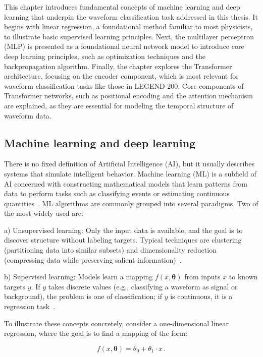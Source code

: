 
This chapter introduces fundamental concepts of machine learning and deep learning that underpin the waveform classification task addressed in this thesis. It begins with linear regression, a foundational method familiar to most physicists, to illustrate basic supervised learning principles.
Next, the multilayer perceptron (MLP) is presented as a foundational neural network model to introduce core deep learning principles, such as optimization techniques and the backpropagation algorithm. 
Finally, the chapter explores the Transformer architecture, focusing on the encoder component, which is most relevant for waveform classification tasks like those in LEGEND-200. Core components of Transformer networks, such as positional encoding and the attention mechanism are explained, as they are essential for modeling the temporal structure of waveform data. 

\subsection{Machine learning and deep learning}
There is no fixed definition of Artificial Intelligence (AI), but it usually describes systems that simulate intelligent behavior. Machine learning (ML) is a subfield of AI concerned with constructing mathematical models that learn patterns from data to perform tasks such as classifying events or estimating continuous quantities~\cite{badillo_introduction_2020, prince_understanding_2023}. 
ML algorithms are commonly grouped into several paradigms. Two of the most widely used are:

a) Unsupervised learning: Only the input data is available, and the goal is to discover structure without labeling targets. Typical techniques are clustering (partitioning data into similar subsets) and dimensionality reduction (compressing data while preserving salient information)~\cite{badillo_introduction_2020}. 

b) Supervised learning: Models learn a mapping $f(x, \boldsymbol{\theta})$ from inputs $x$ to known targets $y$. If $y$ takes discrete values (e.g., classifying a waveform as signal or background), the problem is one of classification; if $y$ is continuous, it is a regression task~\cite{prince_understanding_2023, badillo_introduction_2020}. 


To illustrate these concepts concretely, consider a one-dimensional linear regression, where the goal is to find a mapping of the form:

\begin{equation}
\label{eq:linear_regression}
	f(x, \boldsymbol{\theta}) =  \theta_0 + \theta_1 \cdot x \,.
\end{equation}

